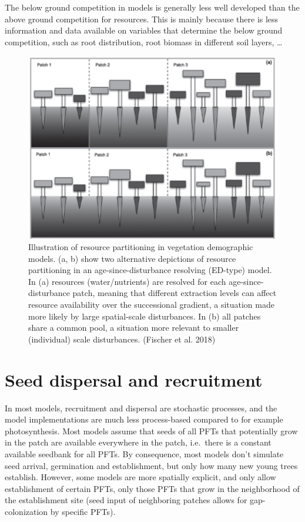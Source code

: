 \documentclass[12pt,oneside]{book}
\begin{document}
The below ground competition in models is generally less well developed
than the above ground competition for resources. This is mainly because
there is less information and data available on variables that determine
the below ground competition, such as root distribution, root biomass in
different soil layers, \ldots{}

\begin{figure}

{\centering \includegraphics[width=0.8\linewidth]{figures/chap6/f631_root_competition} 

}

\caption{Illustration of resource partitioning in vegetation demographic models. (a, b) show two alternative depictions of resource partitioning in an age-since-disturbance resolving (ED-type) model. In (a) resources (water/nutrients) are resolved for each age-since-disturbance patch, meaning that different extraction levels can affect resource availability over the successional gradient, a situation made more likely by large spatial-scale disturbances. In (b) all patches share a common pool, a situation more relevant to smaller (individual) scale disturbances. (Fischer et al. 2018)}\label{fig:f631}
\end{figure}

\section{Seed dispersal and
recruitment}\label{seed-dispersal-and-recruitment}

In most models, recruitment and dispersal are stochastic processes, and
the model implementations are much less process-based compared to for
example photosynthesis. Most models assume that seeds of all PFTs that
potentially grow in the patch are available everywhere in the patch,
i.e.~there is a constant available seedbank for all PFTs. By
consequence, most models don't simulate seed arrival, germination and
establishment, but only how many new young trees establish. However,
some models are more spatially explicit, and only allow establishment of
certain PFTs, only those PFTs that grow in the neighborhood of the
establishment site (seed input of neighboring patches allows for
gap-colonization by specific PFTs).
\end{document}

